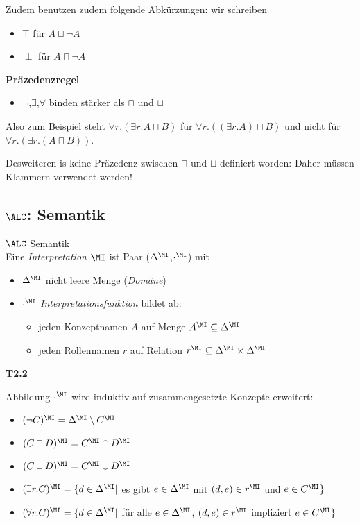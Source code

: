 Zudem benutzen zudem folgende Abkürzungen: wir schreiben

\begin{itemize}
	\item{$\top$ für $A \sqcup \neg A$}
	\item{$\perp$ für $A \sqcap \neg A$}
\end{itemize}

\textbf{Präzedenzregel}

\begin{itemize}
	\item{$\neg$,$\exists$,$\forall$ binden stärker als $\sqcap$ und $\sqcup$}
\end{itemize}

Also zum Beispiel steht $\forall r.(\exists r.A \sqcap B)$ für $\forall r.((\exists r.A) \sqcap B)$ und nicht für $\forall r.(\exists r.(A \sqcap B))$.

Desweiteren is keine Präzedenz zwischen $\sqcap$ und $\sqcup$ definiert worden: Daher müssen Klammern verwendet werden!

\subsection{$\ALC$: Semantik}

\begin{definition}{$\ALC$ Semantik} \\
Eine \emph{Interpretation} $\MI$ ist Paar ($\Delta^\MI$,$\cdot^\MI$) mit
	\begin{itemize}
		\item{$\Delta^\MI$ nicht leere Menge (\emph{Domäne})}
		\item{$\cdot^\MI$ \emph{Interpretationsfunktion} bildet ab:
		 \begin{itemize}
			 \item{jeden Konzeptnamen $A$ auf Menge $A^\MI \subseteq \Delta^\MI$}
			 \item{jeden Rollennamen $r$ auf Relation $r^\MI \subseteq \Delta^\MI \times \Delta^\MI$}
		 \end{itemize}}
	\end{itemize}
\end{definition}

\textbf{T2.2}


Abbildung $\cdot^\MI$ wird induktiv auf zusammengesetzte Konzepte erweitert:

\begin{itemize}
	\item $(\neg C)^\MI = \Delta^\MI \setminus C^\MI$
	\item $(C \sqcap D)^\MI = C^\MI \cap D^\MI$
	\item $(C \sqcup D)^\MI = C^\MI \cup D^\MI$
	\item $(\exists r.C)^\MI = \{d \in \Delta^\MI |$ es gibt $ e \in \Delta^\MI$ mit $(d,e) \in r^\MI$ und $e \in C^\MI\}$
	\item $(\forall r.C)^\MI = \{d \in \Delta^\MI |$ für alle $ e \in \Delta^\MI$, $(d,e) \in r^\MI$ impliziert $e \in C^\MI\}$
\end{itemize}

